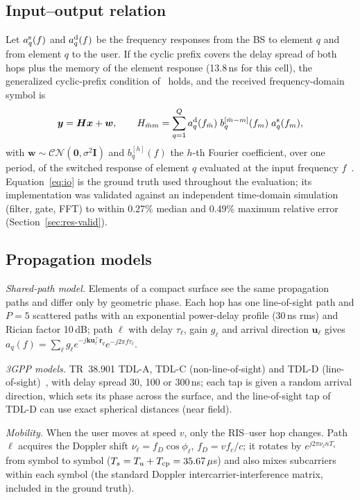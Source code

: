 \subsection{Input--output relation}
Let $a^{\rm s}_q(f)$ and $a^{\rm d}_q(f)$ be the frequency responses from the BS to
element $q$ and from element $q$ to the user. If the cyclic prefix covers the delay
spread of both hops plus the memory of the element response (13.8\,ns for this cell),
the generalized cyclic-prefix condition of~\cite{iudice2026} holds, and the received
frequency-domain symbol is
\begin{equation}
\bm y=\bm H\bm x+\bm w,\qquad
H_{\bar m m}=\sum_{q=1}^{Q} a^{\rm d}_q(f_{\bar m})\;b_q^{[\bar m-m]}(f_m)\;a^{\rm s}_q(f_m),
\label{eq:io}
\end{equation}
with $\bm w\sim\mathcal{CN}(\bm 0,\sigma^2\bm I)$ and $b_q^{[h]}(f)$ the $h$-th Fourier
coefficient, over one period, of the switched response of element $q$ evaluated at the
input frequency $f$~\cite[eq.~(5)]{iudice2026}. Equation~\eqref{eq:io} is the ground truth
used throughout the evaluation; its implementation was validated against an independent
time-domain simulation (filter, gate, FFT) to within 0.27\% median and 0.49\% maximum
relative error (Section~\ref{sec:res-valid}).

\subsection{Propagation models}
\emph{Shared-path model.} Elements of a compact surface see the same propagation paths
and differ only by geometric phase. Each hop has one line-of-sight path and $P=5$
scattered paths with an exponential power-delay profile (30\,ns rms) and Rician factor
10\,dB; path $\ell$ with delay $\tau_\ell$, gain $g_\ell$ and arrival direction
$\bm u_\ell$ gives $a_q(f)=\sum_\ell g_\ell e^{-j\bm k\bm u_\ell^{\top}\bm r_q}e^{-j2\pi f\tau_\ell}$.

\emph{3GPP models.} TR~38.901 TDL-A, TDL-C (non-line-of-sight) and TDL-D
(line-of-sight)~\cite{tr38901}, with delay spread 30, 100 or 300\,ns; each tap is given
a random arrival direction, which sets its phase across the surface, and the
line-of-sight tap of TDL-D can use exact spherical distances (near field).

\emph{Mobility.} When the user moves at speed $v$, only the RIS--user hop changes. Path
$\ell$ acquires the Doppler shift $\nu_\ell=f_D\cos\phi_\ell$, $f_D=vf_c/c$; it rotates by
$e^{j2\pi\nu_\ell nT_s}$ from symbol to symbol ($T_s=T_u+T_{\rm cp}=35.67\,\mu$s) and also
mixes subcarriers within each symbol (the standard Doppler intercarrier-interference
matrix, included in the ground truth).

